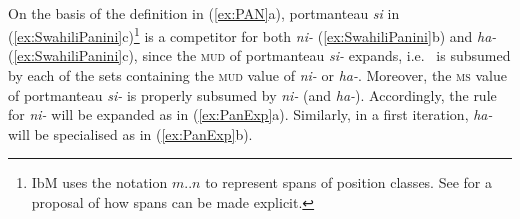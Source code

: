 \documentclass[output=paper
 	        ,biblatex
                ,babelshorthands
                ,newtxmath
                ,draftmode
                ,colorlinks, citecolor=brown
]{langscibook}
\begin{document}
\begin{exe}
\begin{xlist}
\begin{exe}
\begin{xlist}
\begin{exe}
\begin{minipage}[t]{0.4\linewidth} \begin{xlist}
    \end{xlist}
  \end{minipage} ~ \begin{minipage}[t]{0.5\linewidth} \begin{xlist}
    \end{xlist}
  \end{minipage}

\end{exe}

On the basis of the definition in (\ref{ex:PAN}a), portmanteau
\textit{si} in (\ref{ex:SwahiliPanini}c)\footnote{IbM uses the
  notation $m..n$ to represent spans of position classes. See
  \citet{bonami_o-crysmann_b13hpsg} for a proposal of how spans can be made explicit.} is a competitor for both
\textit{ni-} (\ref{ex:SwahiliPanini}b) and \textit{ha-}
(\ref{ex:SwahiliPanini}c), since the \textsc{mud} of portmanteau
\textit{si-} expands, i.e.~ is subsumed by each of the sets containing the \textsc{mud}
value of \textit{ni-} or \textit{ha-}. Moreover, the \textsc{ms} value
of portmanteau \textit{si-} is properly subsumed by \textit{ni-} (and
\textit{ha-}). Accordingly, the rule for \textit{ni-} will be expanded
as in (\ref{ex:PanExp}a).  Similarly, in a first iteration,
\textit{ha-} will be specialised as in (\ref{ex:PanExp}b). 


\end{xlist}
\end{exe}
\end{xlist}
\end{exe}
\end{document}
